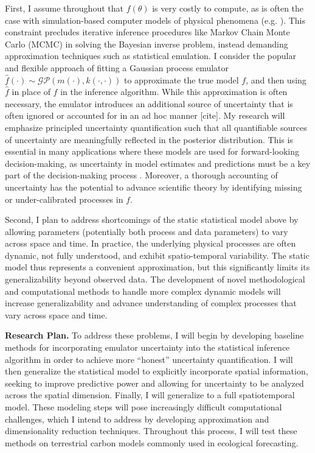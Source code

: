 \documentclass[12pt]{article}
\begin{document}
First, I assume throughout that $f(\theta)$ is very costly to compute, as is often the case with simulation-based computer models of physical phenomena (e.g. \cite{Fer}). 
This constraint precludes iterative inference procedures like Markov Chain Monte Carlo (MCMC) in solving the Bayesian inverse problem, instead demanding 
approximation techniques such as statistical emulation. I consider the popular and flexible approach of fitting a Gaussian process emulator 
$\hat{f}(\cdot) \sim \mathcal{GP}(m(\cdot), k(\cdot, \cdot))$ to approximate the true model $f$, and then using $\hat{f}$ in place of $f$ in the inference algorithm.
 While this approximation is often necessary, the emulator introduces an additional source of uncertainty that is often ignored or accounted for in an ad hoc manner [cite]. My research will emphasize
 principled uncertainty quantification such that all quantifiable sources of uncertainty are meaningfully reflected in the posterior distribution. This is essential in many applications
 where these models are used for forward-looking decision-making, as uncertainty in model estimates and predictions must be a key part of the decision-making process \cite{Dietze}.
 Moreover, a thorough accounting of uncertainty has the potential to advance scientific theory by identifying missing or under-calibrated processes in $f$. 
 
 Second, I plan to address shortcomings of the static statistical model above by allowing parameters (potentially both process and data parameters) to vary across space 
 and time. In practice, the underlying physical processes are often dynamic, not fully understood, and exhibit spatio-temporal variability. The static model thus 
 represents a convenient approximation, but this significantly limits its generalizability beyond observed data. The development of novel methodological and computational 
 methods to handle more complex dynamic models will increase generalizability and advance understanding of complex processes that vary across space and time. 

\noindent
\textbf{Research Plan.} To address these problems, I will begin by developing baseline methods for incorporating emulator uncertainty into the statistical inference algorithm in order to achieve more ``honest''
uncertainty quantification. I will then generalize the statistical model to explicitly incorporate spatial information, seeking to improve predictive power and allowing for uncertainty to be analyzed across
the spatial dimension. Finally, I will generalize to a full spatiotemporal model. These modeling steps will pose increasingly difficult computational challenges, which I intend to address by developing 
approximation and dimensionality reduction techniques. Throughout this process, I will test these methods on terrestrial carbon models commonly used in ecological forecasting. 
 
\end{document}
